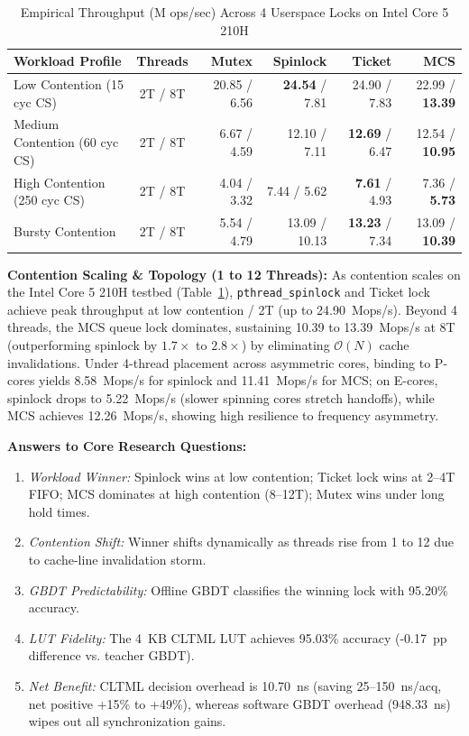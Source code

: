 \documentclass[conference]{IEEEtran}
\begin{document}
\begin{table}[t]
\centering
\caption{Empirical Throughput (M ops/sec) Across 4 Userspace Locks on Intel Core 5 210H}
\label{tab:userspace}
\begin{tabular}{lcrrrr}
\toprule
\textbf{Workload Profile} & \textbf{Threads} & \textbf{Mutex} & \textbf{Spinlock} & \textbf{Ticket} & \textbf{MCS} \\
\midrule
Low Contention (15 cyc CS) & 2T / 8T & 20.85 / 6.56 & \textbf{24.54} / 7.81 & 24.90 / 7.83 & 22.99 / \textbf{13.39} \\
Medium Contention (60 cyc CS) & 2T / 8T & 6.67 / 4.59 & 12.10 / 7.11 & \textbf{12.69} / 6.47 & 12.54 / \textbf{10.95} \\
High Contention (250 cyc CS) & 2T / 8T & 4.04 / 3.32 & 7.44 / 5.62 & \textbf{7.61} / 4.93 & 7.36 / \textbf{5.73} \\
Bursty Contention & 2T / 8T & 5.54 / 4.79 & 13.09 / 10.13 & \textbf{13.23} / 7.34 & 13.09 / \textbf{10.39} \\
\bottomrule
\end{tabular}
\end{table}

\textbf{Contention Scaling \& Topology (1 to 12 Threads):} As contention scales on the Intel Core 5 210H testbed (Table~\ref{tab:userspace}), \texttt{pthread\_spinlock} and Ticket lock achieve peak throughput at low contention / 2T (up to 24.90~Mops/s). Beyond 4 threads, the MCS queue lock dominates, sustaining 10.39 to 13.39~Mops/s at 8T (outperforming spinlock by $1.7\times$ to $2.8\times$) by eliminating $\mathcal{O}(N)$ cache invalidations. Under 4-thread placement across asymmetric cores, binding to P-cores yields 8.58~Mops/s for spinlock and 11.41~Mops/s for MCS; on E-cores, spinlock drops to 5.22~Mops/s (slower spinning cores stretch handoffs), while MCS achieves 12.26~Mops/s, showing high resilience to frequency asymmetry.

\textbf{Answers to Core Research Questions:}
\begin{enumerate}
    \item \textit{Workload Winner:} Spinlock wins at low contention; Ticket lock wins at 2--4T FIFO; MCS dominates at high contention (8--12T); Mutex wins under long hold times.
    \item \textit{Contention Shift:} Winner shifts dynamically as threads rise from 1 to 12 due to cache-line invalidation storm.
    \item \textit{GBDT Predictability:} Offline GBDT classifies the winning lock with 95.20\% accuracy.
    \item \textit{LUT Fidelity:} The 4~KB CLTML LUT achieves 95.03\% accuracy (-0.17~pp difference vs. teacher GBDT).
    \item \textit{Net Benefit:} CLTML decision overhead is 10.70~ns (saving 25--150~ns/acq, net positive +15\% to +49\%), whereas software GBDT overhead (948.33~ns) wipes out all synchronization gains.
\end{enumerate}
\end{document}

